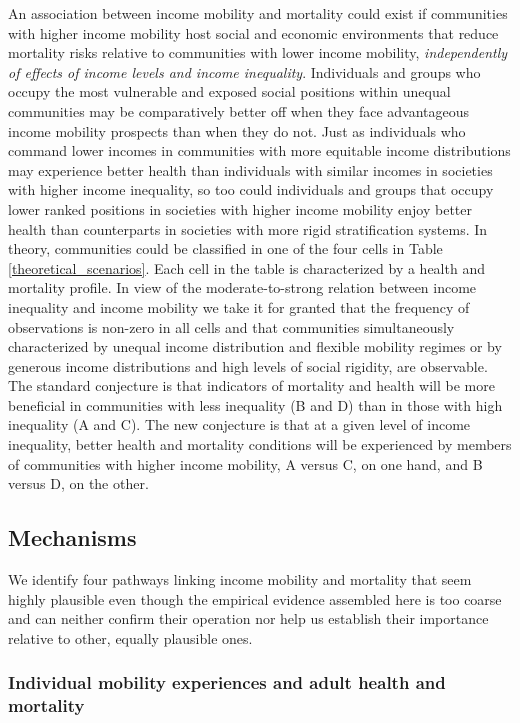 \documentclass[11pt]{article}
\begin{document}
An association between income mobility and mortality could exist if communities with higher income mobility host social and economic environments that reduce mortality risks relative to communities with lower income mobility, \textit{independently of effects of income levels and income inequality}. Individuals and groups who occupy the most vulnerable and exposed social positions within unequal communities may be comparatively better off when they face advantageous income mobility prospects than when they do not. Just as individuals who command lower incomes in communities with more equitable income distributions may experience better health than individuals with similar incomes in societies with higher income inequality, so too could individuals and groups that occupy lower ranked positions in societies with higher income mobility enjoy better health than counterparts in societies with more rigid stratification systems. In theory, communities could be classified in one of the four cells in Table \ref{theoretical_scenarios}. Each cell in the table is characterized by a health and mortality profile. In view of the moderate-to-strong relation between income inequality and income mobility \citep{Palloni2016} we take it for granted that the frequency of observations is non-zero in all cells and that communities simultaneously characterized by unequal income distribution and flexible mobility regimes or by generous income distributions and high levels of social rigidity, are observable. The standard conjecture is that indicators of mortality and health will be more beneficial in communities with less inequality (B and D) than in those with high inequality (A and C). The new conjecture is that at a given level of income inequality, better health and mortality conditions will be experienced by members of communities with higher income mobility, A versus C, on one hand, and B versus D, on the other.

\subsection{Mechanisms}

We identify four pathways linking income mobility and mortality that seem highly plausible even though the empirical evidence assembled here is too coarse and can neither confirm their operation nor help us establish their importance relative to other, equally plausible ones. 

\subsubsection{Individual mobility experiences and adult health and mortality}
\end{document}

